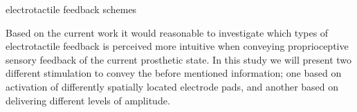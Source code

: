 electrotactile feedback schemes

Based on the current work it would reasonable to investigate which types of electrotactile feedback is perceived more intuitive when conveying proprioceptive sensory feedback of the current prosthetic state. In this study we will present two different stimulation to convey the before mentioned information; one based on activation of differently spatially located electrode pads, and another based on delivering different levels of amplitude.      


 
